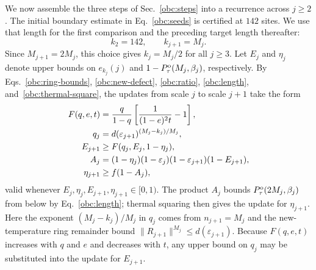 We now assemble the three steps of Sec.~\ref{obc:steps} into a
recurrence across $j\ge2$. The initial boundary estimate in
Eq.~\eqref{obc:seeds} is certified at $142$ sites. We use that length
for the first comparison and the preceding target length thereafter:
\begin{equation}
 k_2=142,\qquad k_{j+1}=M_j.
 \label{obc:k}
\end{equation}
Since $M_{j+1}=2M_j$, this choice gives $k_j=M_j/2$ for all $j\ge3$. Let $E_j$ and $\eta_j$
denote upper bounds on $e_{k_j}(j)$ and $1-P_{\tau}^{\mathrm{o}}(M_j,\beta_j)$, respectively.
By Eqs.~\eqref{obc:ring-bounds}, \eqref{obc:new-defect}, \eqref{obc:ratio}, \eqref{obc:length}, and~\eqref{obc:thermal-square}, the updates from scale $j$ to scale $j+1$ take the form
\begin{align}
 F(q,e,t)&=\frac{q}{1-q}
             \left[\frac{1}{(1-e)^2t}-1\right],\notag \\
 q_j&=d(\varepsilon_{j+1})^{(M_j-k_j)/M_j},\notag \\
 E_{j+1}&\ge F(q_j,E_j,1-\eta_j),\notag \\
 A_j&=(1-\eta_j)(1-\varepsilon_j)
       (1-\varepsilon_{j+1})(1-E_{j+1}),\notag \\
 \eta_{j+1}&\ge f(1-A_j),
 \label{obc:updates}
\end{align}
valid whenever $E_j,\eta_j,E_{j+1},\eta_{j+1}\in[0,1)$.
The product $A_j$ bounds $P_{\tau}^{\mathrm{o}}(2M_j,\beta_j)$ from below by
Eq.~\eqref{obc:length}; thermal squaring then gives the update for
$\eta_{j+1}$.
Here the exponent $(M_j-k_j)/M_j$ in $q_j$ comes from $n_{j+1}=M_j$ and the new-temperature
ring remainder bound $\|R_{j+1}\|^{M_j}\le d(\varepsilon_{j+1})$. Because $F(q,e,t)$ increases with $q$ and $e$ and decreases with $t$,
any upper bound on $q_j$ may be substituted into the update for $E_{j+1}$.


